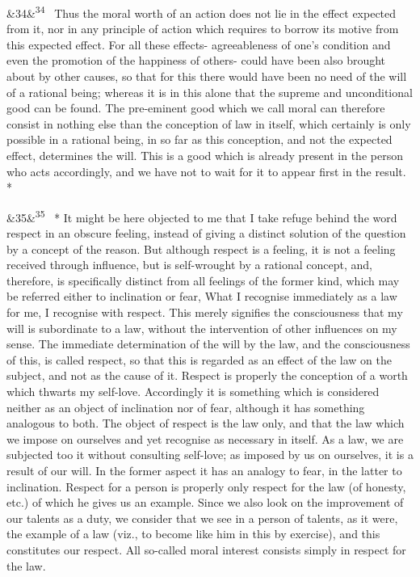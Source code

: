 \documentclass[12pt]{article}
\newcommand{\para}[1][]{\par\noindent\ifx&#1&\else\textsuperscript{\footnotesize #1}~\fi}
\begin{document}
\para[34] Thus the moral worth of an action does not lie in the effect expected from it, nor in any principle of action which requires to borrow its motive from this expected effect. For all these effects- agreeableness of one's condition and even the promotion of the happiness of others- could have been also brought about by other causes, so that for this there would have been no need of the will of a rational being; whereas it is in this alone that the supreme and unconditional good can be found. The pre-eminent good which we call moral can therefore consist in nothing else than the conception of law in itself, which certainly is only possible in a rational being, in so far as this conception, and not the expected effect, determines the will. This is a good which is already present in the person who acts accordingly, and we have not to wait for it to appear first in the result. *

\para[35] * It might be here objected to me that I take refuge behind the word respect in an obscure feeling, instead of giving a distinct solution of the question by a concept of the reason. But although respect is a feeling, it is not a feeling received through influence, but is self-wrought by a rational concept, and, therefore, is specifically distinct from all feelings of the former kind, which may be referred either to inclination or fear, What I recognise immediately as a law for me, I recognise with respect. This merely signifies the consciousness that my will is subordinate to a law, without the intervention of other influences on my sense. The immediate determination of the will by the law, and the consciousness of this, is called respect, so that this is regarded as an effect of the law on the subject, and not as the cause of it. Respect is properly the conception of a worth which thwarts my self-love. Accordingly it is something which is considered neither as an object of inclination nor of fear, although it has something analogous to both. The object of respect is the law only, and that the law which we impose on ourselves and yet recognise as necessary in itself. As a law, we are subjected too it without consulting self-love; as imposed by us on ourselves, it is a result of our will. In the former aspect it has an analogy to fear, in the latter to inclination. Respect for a person is properly only respect for the law (of honesty, etc.) of which he gives us an example. Since we also look on the improvement of our talents as a duty, we consider that we see in a person of talents, as it were, the example of a law (viz., to become like him in this by exercise), and this constitutes our respect. All so-called moral interest consists simply in respect for the law.
\end{document}
